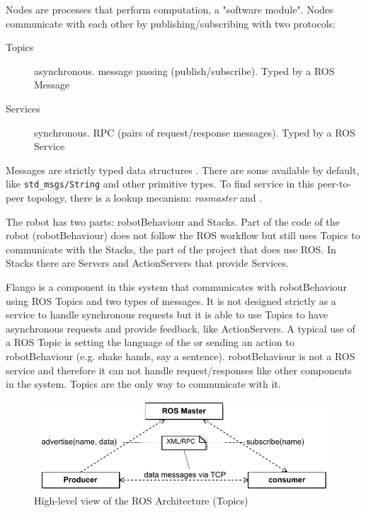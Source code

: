 Nodes are processes that perform computation, a "software module". 
Nodes communicate with each other by publishing/subscribing with two protocols:
\begin{description}
\item[Topics] asynchronous. message passing (publish/subscribe). Typed by a \ac{ROS} Message
\item[Services] synchronous. \ac{RPC} (pairs of request/response messages). Typed by a \ac{ROS} Service
\end{description}

Messages are strictly typed data structures . There are some available by default, like \texttt{std\_msgs/String} and other primitive types.
To find service in this peer-to-peer topology, there is a lookup mecanism: \emph{rosmaster}  and .

The robot has two parts: robotBehaviour and Stacks.
Part of the code of the robot (robotBehaviour) does not follow the \ac{ROS} workflow but still uses Topics to communicate with the Stacks, the part of the project that does use \ac{ROS}.
In Stacks there are Servers and ActionServers that provide Services.

Flango \cm is a component in this system that communicates with robotBehaviour using \ac{ROS} Topics and two types of messages.
It is not designed strictly as a service to handle synchronous requests but it is able to use Topics to have asynchronous requests and provide feedback, like ActionServers.
A typical use of a \ac{ROS} Topic is setting the language of the \cm or sending an action to robotBehaviour (e.g. shake hands, say a sentence).
robotBehaviour is not a \ac{ROS} service and therefore it can not handle request/responses like other components in the system.
Topics are the only way to communicate with it.

\begin{figure}[htb]
    \centering
    \includegraphics{figures/design/ros-architecture-topics.pdf}
    \caption{High-level view of the ROS Architecture (Topics)}
    \label{fig:design-ros-topics}
\end{figure}

